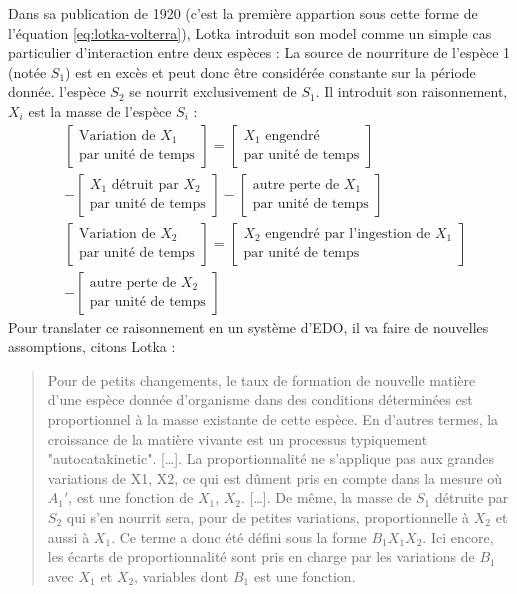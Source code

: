 \documentclass{wsdcr}
\begin{document}
Dans sa publication de 1920 (c'est la première appartion sous cette forme de l'équation \ref{eq:lotka-volterra}), Lotka introduit son model comme un simple cas particulier d'interaction entre deux espèces : La source de nourriture de l'espèce 1 (notée $S_1$) est en excès et peut donc être considérée constante sur la période donnée. l'espèce $S_2$ se nourrit exclusivement de $S_1$.
Il introduit son raisonnement, $X_i$ est la masse de l'espèce $S_i$ :
\begin{equation}
\begin{aligned}
&\begin{bmatrix}
\text{Variation de }X_1 \\ \text{par unité de temps}
\end{bmatrix}
=
\begin{bmatrix}
X_1\text{ engendré}\\ \text{par unité de temps}
\end{bmatrix} \\
&- 
\begin{bmatrix}
X_1\text{ détruit par }X_2\\ \text{par unité de temps}
\end{bmatrix}
-
\begin{bmatrix}
\text{autre perte de }X_1\\ \text{par unité de temps}
\end{bmatrix} \\
&\begin{bmatrix}
\text{Variation de }X_2 \\ \text{par unité de temps}
\end{bmatrix}
=
\begin{bmatrix}
X_2\text{ engendré par l'ingestion de }X_1\\ \text{par unité de temps}
\end{bmatrix} \\
&-
\begin{bmatrix}
\text{autre perte de }X_2\\ \text{par unité de temps}
\end{bmatrix} 
\end{aligned}
\end{equation}
Pour translater ce raisonnement en un système d'EDO, il va faire de nouvelles assomptions, citons Lotka :
\begin{quotation}
Pour de petits changements, le taux de formation de nouvelle matière d'une espèce donnée d'organisme dans des conditions déterminées est proportionnel à la masse existante de cette espèce. En d'autres termes, la croissance de la matière vivante est un processus typiquement "autocatakinetic". […]. La proportionnalité ne s'applique pas aux grandes variations de X1, X2, ce qui est dûment pris en compte dans la mesure où $A_1'$, est une fonction de $X_1$, $X_2$. […]. De même, la masse de $S_1$ détruite par $S_2$ qui s'en nourrit sera, pour de petites variations, proportionnelle à $X_2$ et aussi à $X_1$. Ce terme a donc été défini sous la forme $B_1X_1X_2$. Ici encore, les écarts de proportionnalité sont pris en charge par les variations de $B_1$ avec $X_1$ et $X_2$, variables dont $B_1$ est une fonction.
\end{quotation}
\end{document}
